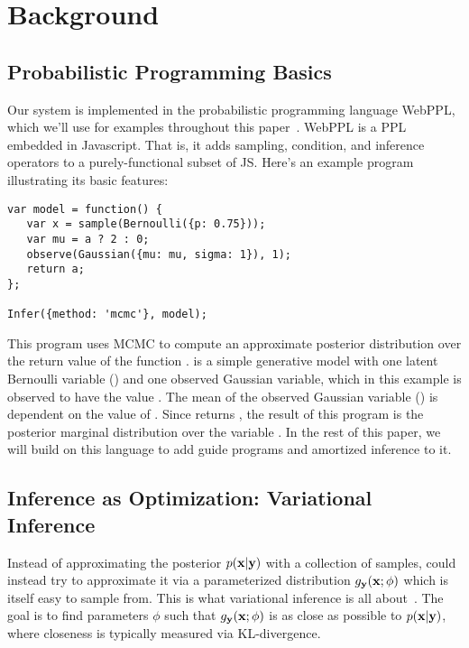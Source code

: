 \section{Background}
\label{sec:background}

\subsection{Probabilistic Programming Basics}

Our system is implemented in the probabilistic programming language WebPPL, which we'll use for examples throughout this paper~\cite{WebPPL}.
WebPPL is a PPL embedded in Javascript.
That is, it adds sampling, condition, and inference operators to a purely-functional subset of JS.
Here's an example program illustrating its basic features:
\begin{lstlisting}
var model = function() {
   var x = sample(Bernoulli({p: 0.75}));
   var mu = a ? 2 : 0;
   observe(Gaussian({mu: mu, sigma: 1}), 1);
   return a;
};

Infer({method: 'mcmc'}, model);
\end{lstlisting}
This program uses MCMC to compute an approximate posterior distribution over the return value of the function .  is a simple generative model with one latent Bernoulli variable () and one observed Gaussian variable, which in this example is observed to have the value . The mean of the observed Gaussian variable () is dependent on the value of . Since  returns , the result of this program is the posterior marginal distribution over the variable .
In the rest of this paper, we will build on this language to add guide programs and amortized inference to it.

\subsection{Inference as Optimization: Variational Inference}

Instead of approximating the posterior $p(\mathbf{x} | \mathbf{y})$ with a collection of samples, could instead try to approximate it via a parameterized distribution $g_{\mathbf{y}}(\mathbf{x} ; \phi)$ which is itself easy to sample from.
This is what variational inference is all about~\cite{VariationalInference}.
The goal is to find parameters $\phi$ such that $g_{\mathbf{y}}(\mathbf{x} ; \phi)$ is as close as possible to $p(\mathbf{x} | \mathbf{y})$, where closeness is typically measured via KL-divergence.

